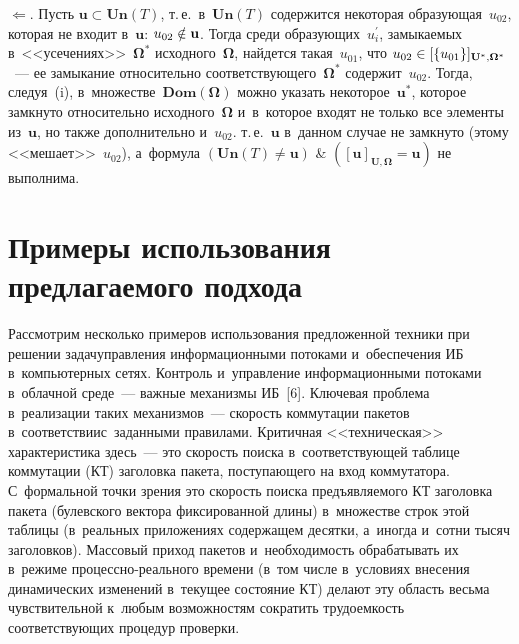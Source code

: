 \begin{multicols}{2}
\noindent
$\Leftarrow$. Пусть $\mathbf{u}\subset \mathbf{Un}(T)$, т.\,е.\ 
в~$\mathbf{Un}(T)$ содержится некоторая образующая~$u_{02}$, которая 
не входит в~$\mathbf{u}$: $u_{02}\hm\notin \mathbf{u}$. Тогда среди 
образующих~$u^\prime_i$, замыкаемых в~<<усечениях>>~${\boldsymbol{\Omega}}^*$ 
исходного~${\boldsymbol{\Omega}}$, найдется такая~$u_{01}$, что $u_{02}\hm\in 
[\{u_{01}\}]_{\mathbf{U}^*,{\boldsymbol{\Omega}}^*}$~--- ее замыкание относительно 
соответствующего~${\boldsymbol{\Omega}}^*$ содержит~$u_{02}$. Тогда, следуя~(i), 
в~множестве~$\mathbf{Dom}({\boldsymbol{\Omega}})$ можно указать 
некоторое~$\mathbf{u}^*$, которое замкнуто относительно 
исходного~${\boldsymbol{\Omega}}$ и~в~которое входят не только все элементы 
из~$\mathbf{u}$, но также дополнительно и~$u_{02}$. т.\,е.\ $\mathbf{u}$ 
в~данном случае не замкнуто (этому <<мешает>>~$u_{02}$), а~формула 
$(\mathbf{Un}(T)\not= \mathbf{u})$ \& 
$([\mathbf{u}]_{\mathbf{U},{\boldsymbol{\Omega}}}=\mathbf{u})$ не выполнима.

\section{Примеры использования предлагаемого подхода}

\vspace*{-2pt}

    Рассмотрим несколько примеров использования предложенной техники 
при решении задач\linebreak управления информационными потоками и~обеспечения 
ИБ в~компьютерных сетях. Контроль\linebreak 
и~управ\-ле\-ние информационными потоками в~об\-лач\-ной среде~--- важные 
механизмы ИБ~[6]. Клю\-чевая проблема 
в~реализации таких механизмов~--- скорость коммутации пакетов 
в~соответствии\linebreak с~заданными правилами. Критичная <<техническая>>
характеристика здесь~--- это скорость поиска в~соответствующей таблице 
коммутации (КТ) заголовка пакета, поступающего на вход коммутатора. 
С~формальной точки зрения это скорость поиска предъявляемого КТ 
заголовка пакета (булевского вектора фиксированной длины) в~множестве 
строк этой таблицы (в~реальных приложениях содержащем десятки, а~иногда и~сотни тысяч заголовков). Массовый приход пакетов и~необходимость 
обрабатывать их в~режиме про\-цес\-сно-ре\-аль\-но\-го времени (в~том числе 
в~условиях внесения динамических изменений в~текущее состояние КТ) 
делают эту область весьма чувствительной к~любым возможностям сократить 
трудоемкость соответствующих процедур проверки.
    

\end{multicols}
